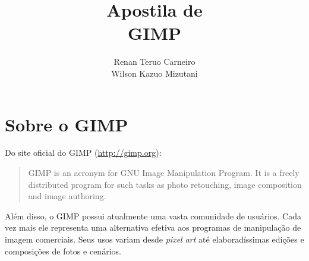 \documentclass[12pt,onecolumn]{article}
\begin{document}
\begin{titlepage}

    \title{
        \bf
        \LARGE Apostila de \\
        \Huge  GIMP
    }
    
    \author{Renan Teruo Carneiro \\ Wilson Kazuo Mizutani}
    
    \maketitle
    
    \thispagestyle{empty}
    
\end{titlepage}

\tableofcontents

\clearpage

\section{Sobre o GIMP}
  Do site oficial do GIMP (\url{http://gimp.org}):
  
  \begin{quotation}
    GIMP is an acronym for GNU Image Manipulation Program. It is a freely
    distributed program for such tasks as photo retouching, image composition
    and image authoring.
  \end{quotation}
  
  Além disso, o GIMP possui atualmente uma vasta comunidade de usuários. Cada
  vez mais ele representa uma alternativa efetiva aos programas de manipulação
  de imagem comerciais. Seus usos variam desde {\it pixel art} até
  elaboradíssimas edições e composições de fotos e cenários.
  
  \vspace{50pt}
  
\end{document}
